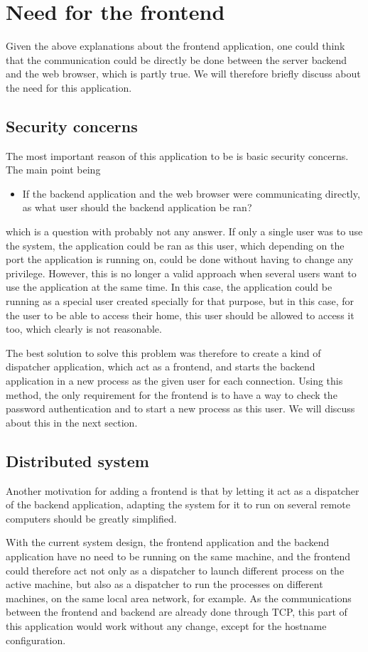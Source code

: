 \section{Need for the frontend}
Given the above explanations about the frontend application, one could 
think that the communication could be directly be done between the 
server backend and the web browser, which is partly true. We will therefore
briefly discuss about the need for this application.
%
\subsection{Security concerns}
The most important reason of this application to be is basic security concerns. 
The main point being
\begin{itemize}
\item If the backend application and the web browser were communicating directly, 
  as what user should the backend application be ran?   
\end{itemize}
which is a question with probably not any answer. If only a single user was to 
use the system, the application could be ran as this user, which depending on the 
port the application is running on, could be done without having to change any privilege.
However, this is no longer a valid approach when several users want to use the application 
at the same time. In this case, the application could be running as a special user 
created specially for that purpose, but in this case, for the user to be able to access 
their home, this user should be allowed to access it too, which clearly is not reasonable.

The best solution to solve this problem was therefore to create a kind of dispatcher application, 
which act as a frontend, and starts the backend application in a new process as the given user 
for each connection. Using this method, the only requirement for the frontend is to have a
way to check the password authentication and to start a new process as this user. We will 
discuss about this in the next section.
%
\subsection{Distributed system}
Another motivation for adding a frontend is that by letting it act as a dispatcher 
of the backend application, adapting the system for it to run on several remote computers
should be greatly simplified. 

With the current system design, the frontend application and the backend application have no need 
to be running on the same machine, and the frontend could therefore act not only as a dispatcher 
to launch different process on the active machine, but also as a dispatcher to run the processes 
on different machines, on the same local area network, for example. As the communications 
between the frontend and backend are already done through TCP, this part of this 
application would work without any change, except for the hostname configuration.
